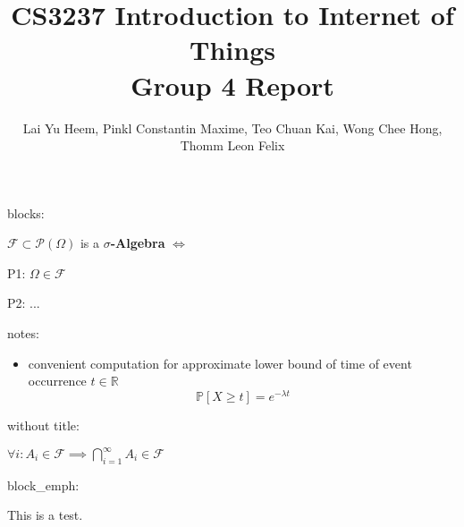 \documentclass{article}
\begin{document}


blocks:

\begin{_block}

$\mathcal{F}\subset\mathcal{P}(\Omega)$ is a \textbf{$\sigma$-Algebra}
$\iff$

P1: $\Omega\in\mathcal{F}$

P2: ...

\end{_block}

notes:

\begin{_note}[Properties]
\begin{itemize}
\item convenient computation for approximate lower bound of time of event occurrence $t\in\mathbb{R}$
\[
\mathbb{P}[X\geq t]=e^{-\lambda t}
\]
\end{itemize}
\end{_note}

without title:

\begin{_note}[]

$\forall i:A_{i}\in\mathcal{F}\implies\bigcap_{i=1}^{\infty}A_{i}\in\mathcal{F}$

\end{_note}

block\_emph:

\begin{_block_emph}
This is a test.
\end{_block_emph}

\title{CS3237 Introduction to Internet of Things \\ Group 4 Report}
\author{Lai Yu Heem, Pinkl Constantin Maxime, Teo Chuan Kai, Wong Chee Hong, Thomm Leon Felix}
\maketitle

\renewcommand\thesection{\arabic{section}}
\renewcommand\thesubsection{\thesection.\alph{subsection}}
\end{document}

